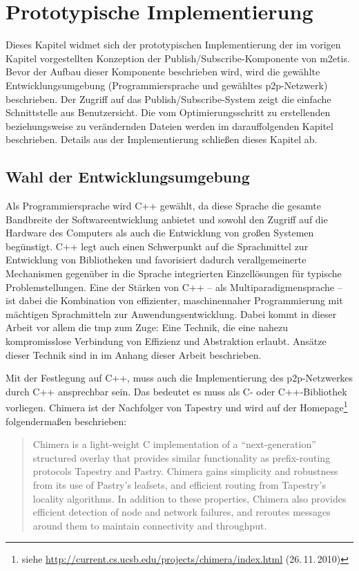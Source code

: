 \chapter{Prototypische Implementierung}
\label{chap:impl}
Dieses Kapitel widmet sich der prototypischen Implementierung der im vorigen Kapitel vorgestellten Konzeption der Publish/Subscribe-Komponente von \ac{m2etis}. Bevor der Aufbau dieser Komponente beschrieben wird, wird die gewählte Entwicklungsumgebung (Programmiersprache und gewähltes \ac{p2p}-Netzwerk) beschrieben. Der Zugriff auf das Publish/Subscribe-System zeigt die einfache Schnittstelle aus Benutzersicht. Die vom Optimierungsschritt zu erstellenden beziehungsweise zu verändernden Dateien werden im darauffolgenden Kapitel beschrieben. Details aus der Implementierung schließen dieses Kapitel ab.

\section{Wahl der Entwicklungsumgebung}
Als Programmiersprache wird C++ gewählt, da diese Sprache die gesamte Bandbreite der Softwareentwicklung anbietet und sowohl den Zugriff auf die Hardware des Computers als auch die Entwicklung von großen Systemen begünstigt. C++ legt auch einen Schwerpunkt auf die Sprachmittel zur Entwicklung von Bibliotheken und favorisiert dadurch verallgemeinerte Mechanismen gegenüber in die Sprache integrierten Einzellösungen für typische Problemstellungen. Eine der Stärken von C++ -- als Multiparadigmensprache -- ist dabei die Kombination von effizienter, maschinennaher Programmierung mit mächtigen Sprachmitteln zur Anwendungsentwicklung. Dabei kommt in dieser Arbeit vor allem die \acf{tmp} zum Zuge: Eine Technik, die eine nahezu kompromisslose Verbindung von Effizienz und Abstraktion erlaubt. Ansätze dieser Technik sind in  im Anhang dieser Arbeit beschrieben.

Mit der Festlegung auf C++, muss auch die Implementierung des p2p-Netzwerkes durch C++ ansprechbar sein. Das bedeutet es muss als C- oder C++-Bibliothek vorliegen. Chimera \cite{Allen2006Chimera} ist der Nachfolger von Tapestry und wird auf der Homepage\footnote{siehe \url{http://current.cs.ucsb.edu/projects/chimera/index.html} (26.\,11.\,2010)} folgendermaßen beschrieben: 
\begin{quote}
Chimera is a light-weight C implementation of a \enquote{next-generation} structured overlay that provides similar functionality as prefix-routing protocols Tapestry and Pastry.  Chimera gains simplicity and robustness from its use of Pastry's leafsets, and efficient routing from Tapestry's locality algorithms.  In addition to these properties, Chimera also provides efficient detection of node and network failures, and reroutes messages around them to maintain connectivity and throughput.  
\end{quote}

